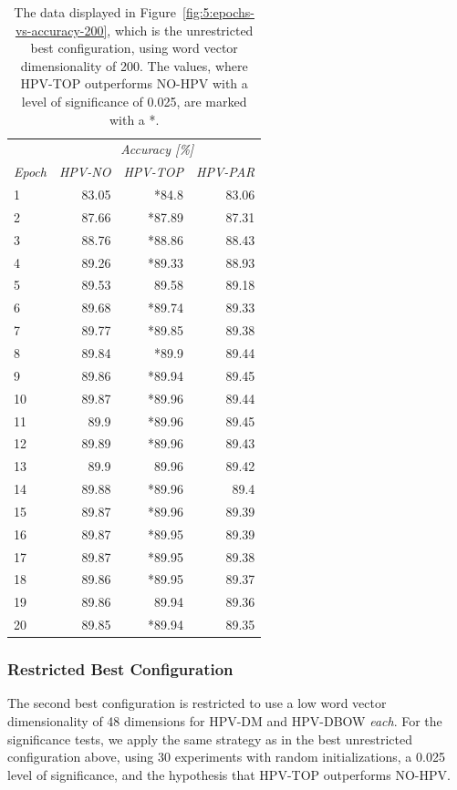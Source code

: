 \begin{table}
	\centering
	\caption{The data displayed in Figure~\ref{fig:5:epochs-vs-accuracy-200}, which is the unrestricted best configuration, using word vector dimensionality of 200. The values, where HPV-TOP outperforms NO-HPV with a level of significance of 0.025, are marked with a *.}
	\label{tab:5:epochs-vs-accuracy-200}
	\begin{tabular}{lrrr}
		\toprule
		& \multicolumn{3}{c}{\emph{Accuracy [\%]}}\tabularnewline
		\emph{Epoch}& \emph{HPV-NO}& \emph{HPV-TOP}& \emph{HPV-PAR}\tabularnewline
		\midrule
		1& 83.05& *84.8& 83.06\tabularnewline
		2& 87.66& *87.89& 87.31\tabularnewline
		3& 88.76& *88.86& 88.43\tabularnewline
		4& 89.26& *89.33& 88.93\tabularnewline
		5& 89.53& 89.58& 89.18\tabularnewline
		6& 89.68& *89.74& 89.33\tabularnewline
		7& 89.77& *89.85& 89.38\tabularnewline
		8& 89.84& *89.9& 89.44\tabularnewline
		9& 89.86& *89.94& 89.45\tabularnewline
		10& 89.87& *89.96& 89.44\tabularnewline
		11& 89.9& *89.96& 89.45\tabularnewline
		12& 89.89& *89.96& 89.43\tabularnewline
		13& 89.9& 89.96& 89.42\tabularnewline
		14& 89.88& *89.96& 89.4\tabularnewline
		15& 89.87& *89.96& 89.39\tabularnewline
		16& 89.87& *89.95& 89.39\tabularnewline
		17& 89.87& *89.95& 89.38\tabularnewline
		18& 89.86& *89.95& 89.37\tabularnewline
		19& 89.86& 89.94& 89.36\tabularnewline
		20& 89.85& *89.94& 89.35\tabularnewline
		\bottomrule
	\end{tabular}
\end{table}


\subsubsection{Restricted Best Configuration}\label{restricted-best-configuration}

The second best configuration is restricted to use a low word vector dimensionality of 48 dimensions for HPV-DM and HPV-DBOW \emph{each}. For the significance tests, we apply the same strategy as in the best unrestricted configuration above, using 30 experiments with random initializations, a 0.025 level of significance, and the hypothesis that HPV-TOP outperforms NO-HPV\@.

